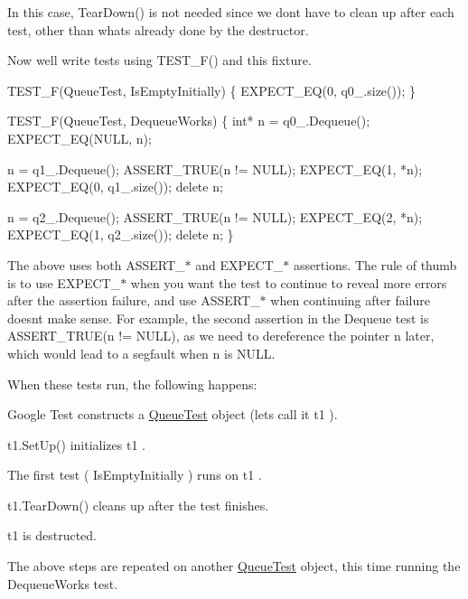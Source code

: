 In this case, {\ttfamily Tear\+Down()} is not needed since we don\textquotesingle{}t have to clean up after each test, other than what\textquotesingle{}s already done by the destructor.

Now we\textquotesingle{}ll write tests using {\ttfamily T\+E\+S\+T\+\_\+\+F()} and this fixture. 
\begin{DoxyCode}
TEST\_F(QueueTest, IsEmptyInitially) \{
  EXPECT\_EQ(0, q0\_.size());
\}

TEST\_F(QueueTest, DequeueWorks) \{
  int* n = q0\_.Dequeue();
  EXPECT\_EQ(NULL, n);

  n = q1\_.Dequeue();
  ASSERT\_TRUE(n != NULL);
  EXPECT\_EQ(1, *n);
  EXPECT\_EQ(0, q1\_.size());
  delete n;

  n = q2\_.Dequeue();
  ASSERT\_TRUE(n != NULL);
  EXPECT\_EQ(2, *n);
  EXPECT\_EQ(1, q2\_.size());
  delete n;
\}
\end{DoxyCode}


The above uses both {\ttfamily A\+S\+S\+E\+R\+T\+\_\+$\ast$} and {\ttfamily E\+X\+P\+E\+C\+T\+\_\+$\ast$} assertions. The rule of thumb is to use {\ttfamily E\+X\+P\+E\+C\+T\+\_\+$\ast$} when you want the test to continue to reveal more errors after the assertion failure, and use {\ttfamily A\+S\+S\+E\+R\+T\+\_\+$\ast$} when continuing after failure doesn\textquotesingle{}t make sense. For example, the second assertion in the {\ttfamily Dequeue} test is {\ttfamily A\+S\+S\+E\+R\+T\+\_\+\+T\+R\+UE(n != N\+U\+LL)}, as we need to dereference the pointer {\ttfamily n} later, which would lead to a segfault when {\ttfamily n} is {\ttfamily N\+U\+LL}.

When these tests run, the following happens\+:
\begin{DoxyEnumerate}
\item Google Test constructs a {\ttfamily \mbox{\hyperlink{class_queue_test}{Queue\+Test}}} object (let\textquotesingle{}s call it {\ttfamily t1} ).
\end{DoxyEnumerate}
\begin{DoxyEnumerate}
\item {\ttfamily t1.\+Set\+Up()} initializes {\ttfamily t1} .
\end{DoxyEnumerate}
\begin{DoxyEnumerate}
\item The first test ( {\ttfamily Is\+Empty\+Initially} ) runs on {\ttfamily t1} .
\end{DoxyEnumerate}
\begin{DoxyEnumerate}
\item {\ttfamily t1.\+Tear\+Down()} cleans up after the test finishes.
\end{DoxyEnumerate}
\begin{DoxyEnumerate}
\item {\ttfamily t1} is destructed.
\end{DoxyEnumerate}
\begin{DoxyEnumerate}
\item The above steps are repeated on another {\ttfamily \mbox{\hyperlink{class_queue_test}{Queue\+Test}}} object, this time running the {\ttfamily Dequeue\+Works} test.
\end{DoxyEnumerate}

